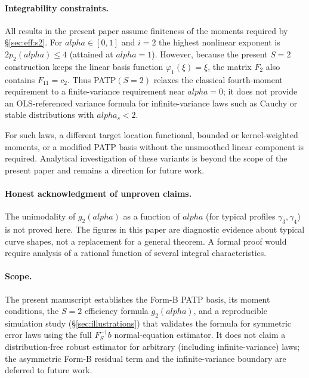 \documentclass[11pt]{article}
\def\alpha{alpha}%
\def\vec#1{#1}%
\def\mathbf#1{#1}%
\theoremstyle{definition}
\begin{document}
\paragraph{Integrability constraints.}
All results in the present paper assume finiteness of the moments required by
\S\ref{sec:eff:s2}. For $\alpha \in [0, 1]$ and $i = 2$ the highest
nonlinear exponent is $2p_2(\alpha) \leq 4$ (attained at $\alpha = 1$).
However, because the present $S=2$ construction keeps the linear basis
function $\varphi_1(\xi)=\xi$, the matrix $\mathbf F_2$ also contains
$F_{11}=c_2$. Thus PATP$(S=2)$ relaxes the classical fourth-moment
requirement to a finite-variance requirement near $\alpha=0$; it does not
provide an OLS-referenced variance formula for infinite-variance laws such
as Cauchy or stable distributions with $\alpha_s<2$.

For such laws, a different target location functional, bounded or
kernel-weighted moments, or a modified PATP basis without the unsmoothed
linear component is required. Analytical investigation of these variants is
beyond the scope of the present paper and remains a direction for future
work.

\paragraph{Honest acknowledgment of unproven claims.}
The unimodality of $g_2(\alpha)$ as a function of $\alpha$ (for typical
profiles $\gamma_3, \gamma_4$) is not proved here. The figures in this paper
are diagnostic evidence about typical curve shapes, not a replacement for a
general theorem. A formal proof would require analysis of a rational function
of several integral characteristics.

\paragraph{Scope.}
The present manuscript establishes the Form-B PATP basis, its moment
conditions, the $S=2$ efficiency formula $g_2(\alpha)$, and a reproducible
simulation study (\S\ref{sec:illustrations}) that validates the formula for
symmetric error laws using the full $\mathbf{F}_S^{-1}\vec b$ normal-equation
estimator. It does not claim a distribution-free robust estimator for arbitrary
(including infinite-variance) laws; the asymmetric Form-B residual term and the
infinite-variance boundary are deferred to future work.

\end{document}
